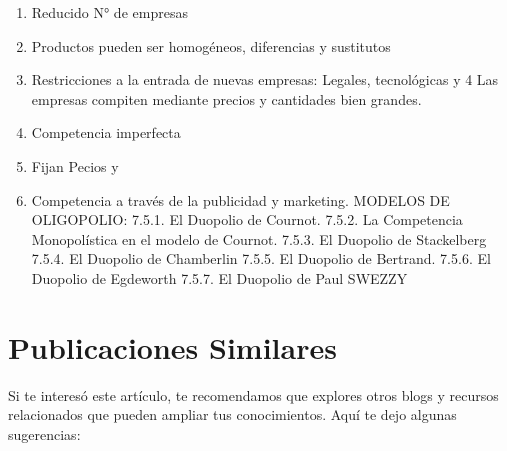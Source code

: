 \documentclass[
  jou,
  floatsintext,
  longtable,
  a4paper,
  nolmodern,
  notxfonts,
  notimes,
  12pt,
  colorlinks=true,linkcolor=blue,citecolor=blue,urlcolor=blue]{apa7}
\providecommand{\tightlist}{%
  \setlength{\itemsep}{0pt}\setlength{\parskip}{0pt}}
\begin{document}
\begin{enumerate}
  \begin{enumerate}
  \def\labelenumii{\Alph{enumii})}
  \tightlist
  \item
    Definición
  \item
    Características
  \end{enumerate}
\item
  Reducido N° de empresas
\item
  Productos pueden ser homogéneos, diferencias y sustitutos
\item
  Restricciones a la entrada de nuevas empresas: Legales, tecnológicas y
  4 Las empresas compiten mediante precios y cantidades bien grandes.
\item
  Competencia imperfecta
\item
  Fijan Pecios y
\item
  Competencia a través de la publicidad y marketing. MODELOS DE
  OLIGOPOLIO: 7.5.1. El Duopolio de Cournot. 7.5.2. La Competencia
  Monopolística en el modelo de Cournot. 7.5.3. El Duopolio de
  Stackelberg 7.5.4. El Duopolio de Chamberlin 7.5.5. El Duopolio de
  Bertrand. 7.5.6. El Duopolio de Egdeworth 7.5.7. El Duopolio de Paul
  SWEZZY
\end{enumerate}

\section{Publicaciones Similares}\label{publicaciones-similares}

Si te interesó este artículo, te recomendamos que explores otros blogs y
recursos relacionados que pueden ampliar tus conocimientos. Aquí te dejo
algunas sugerencias:
\end{document}
